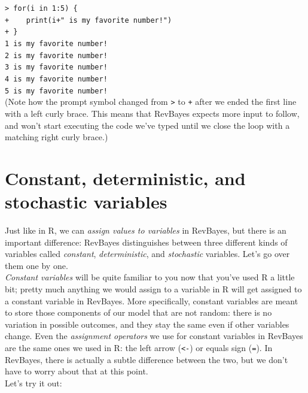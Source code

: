 \documentclass[12pt]{article}
\begin{document}
\indent \texttt{> for(i in 1:5) \{} \\
\indent \texttt{+\ \ \ \ print(i+" is my favorite number!")} \\
\indent \texttt{+ \}} \\
\indent \texttt{1 is my favorite number!} \\
\indent \texttt{2 is my favorite number!} \\
\indent \texttt{3 is my favorite number!} \\
\indent \texttt{4 is my favorite number!} \\
\indent \texttt{5 is my favorite number!} \\

\noindent (Note how the prompt symbol changed from \texttt{>} to \texttt{+} after we ended the first line with a left curly brace. This means that RevBayes expects more input to follow, and won't start executing the code we've typed until we close the loop with a matching right curly brace.)

\section*{Constant, deterministic, and stochastic variables}

Just like in \textsf{R}, we can \textit{assign values to variables} in RevBayes, but there is an important difference: RevBayes distinguishes between three different kinds of variables called \textit{constant}, \textit{deterministic}, and \textit{stochastic} variables. Let's go over them one by one. \\

\noindent \textit{Constant variables} will be quite familiar to you now that you've used \textsf{R} a little bit; pretty much anything we would assign to a variable in \textsf{R} will get assigned to a constant variable in RevBayes. More specifically, constant variables are meant to store those components of our model that are not random: there is no variation in possible outcomes, and they stay the same even if other variables change. Even the \textit{assignment operators} we use for constant variables in RevBayes are the same ones we used in \textsf{R}: the left arrow (\texttt{<-}) or equals sign (\texttt{=}). In RevBayes, there is actually a subtle difference between the two, but we don't have to worry about that at this point. \\

\noindent Let's try it out: \\
\end{document}
